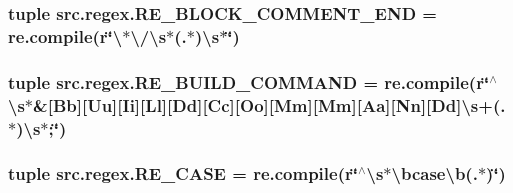 \hypertarget{namespacesrc_1_1regex_a8091f209d3a5b2884407944a5f2fe96b}{
\subsubsection[{R\-E\-\_\-\-B\-L\-O\-C\-K\-\_\-\-C\-O\-M\-M\-E\-N\-T\-\_\-\-E\-N\-D}]{\setlength{\rightskip}{0pt plus 5cm}tuple src.\-regex.\-R\-E\-\_\-\-B\-L\-O\-C\-K\-\_\-\-C\-O\-M\-M\-E\-N\-T\-\_\-\-E\-N\-D = re.\-compile(r\char`\"{}\textbackslash{}$\ast$\textbackslash{}/\textbackslash{}s$\ast$(.$\ast$)\textbackslash{}s$\ast$\char`\"{})}}\label{namespacesrc_1_1regex_a8091f209d3a5b2884407944a5f2fe96b}
\hypertarget{namespacesrc_1_1regex_a1f0592903851e0dbbc2103d8635cb0e0}{
\subsubsection[{R\-E\-\_\-\-B\-U\-I\-L\-D\-\_\-\-C\-O\-M\-M\-A\-N\-D}]{\setlength{\rightskip}{0pt plus 5cm}tuple src.\-regex.\-R\-E\-\_\-\-B\-U\-I\-L\-D\-\_\-\-C\-O\-M\-M\-A\-N\-D = re.\-compile(r\char`\"{}$^\wedge$\textbackslash{}s$\ast$\&\mbox{[}Bb\mbox{]}\mbox{[}Uu\mbox{]}\mbox{[}Ii\mbox{]}\mbox{[}Ll\mbox{]}\mbox{[}Dd\mbox{]}\mbox{[}Cc\mbox{]}\mbox{[}Oo\mbox{]}\mbox{[}Mm\mbox{]}\mbox{[}Mm\mbox{]}\mbox{[}Aa\mbox{]}\mbox{[}Nn\mbox{]}\mbox{[}Dd\mbox{]}\textbackslash{}s+(.$\ast$)\textbackslash{}s$\ast$;\char`\"{})}}\label{namespacesrc_1_1regex_a1f0592903851e0dbbc2103d8635cb0e0}
\hypertarget{namespacesrc_1_1regex_a5ae4abff9bd1f9ce1c3e9da976060fce}{
\subsubsection[{R\-E\-\_\-\-C\-A\-S\-E}]{\setlength{\rightskip}{0pt plus 5cm}tuple src.\-regex.\-R\-E\-\_\-\-C\-A\-S\-E = re.\-compile(r\char`\"{}$^\wedge$\textbackslash{}s$\ast$\textbackslash{}bcase\textbackslash{}b(.$\ast$)\char`\"{})}}\label{namespacesrc_1_1regex_a5ae4abff9bd1f9ce1c3e9da976060fce}
